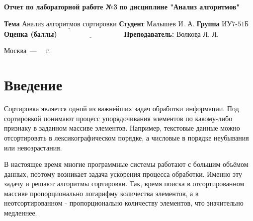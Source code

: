 \documentclass[12pt]{report}
\begin{document}
\begin{titlepage}
	
	\begin{center}
		\noindent\begin{minipage}{1.3\textwidth}\centering
			\Large\textbf{  Отчет по лабораторной работе №3}\newline
			\textbf{по дисциплине "Анализ алгоритмов"}\newline\newline
		\end{minipage}
	\end{center}
	
	\noindent\textbf{Тема} $\underline{\text{Анализ алгоритмов сортировки}}$\newline\newline
	\noindent\textbf{Студент} $\underline{\text{Малышев И. А.}}$\newline\newline
	\noindent\textbf{Группа} $\underline{\text{ИУ7-51Б}}$\newline\newline
	\noindent\textbf{Оценка (баллы)} $\underline{\text{~~~~~~~~~~~~~~~~~~~~~~~~~~~}}$\newline\newline
	\noindent\textbf{Преподаватель: } $\underline{\text{Волкова Л. Л.}}$\newline\newline\newline
	
	\begin{center}
		\vfill
		Москва~---~\the\year
		~г.
	\end{center}
\end{titlepage}


\tableofcontents
  
\newpage
\chapter*{Введение}


Сортировка является одной из важнейших задач обработки информации. Под сортировкой понимают процесс упорядочивания элементов по какому-либо признаку в заданном массиве элементов. Например, текстовые данные можно отсортировать в лексикографическом порядке, а числовые в порядке неубывания или невозрастания.

В настоящее время многие программные системы работают с большим объёмом данных, поэтому возникает задача ускорения процесса обработки. Именно эту задачу и решают алгоритмы сортировки. Так, время поиска в отсортированном массиве пропорционально логарифму количества элементов, а в неотсортированном - пропорционально количеству элементов, что значительно медленнее.
\end{document}
